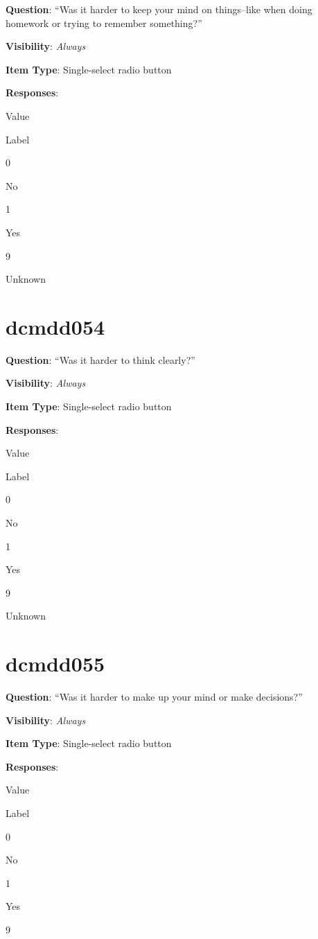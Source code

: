 \documentclass[]{book}
\begin{document}
\textbf{Question}: ``Was it harder to keep your mind on things--like when doing homework or trying to remember something?''

\textbf{Visibility}: \emph{Always}

\textbf{Item Type}: Single-select radio button

\textbf{Responses}:

Value

Label

0

No

1

Yes

9

Unknown

\hypertarget{dcmdd054}{%
\section{dcmdd054}\label{dcmdd054}}

\textbf{Question}: ``Was it harder to think clearly?''

\textbf{Visibility}: \emph{Always}

\textbf{Item Type}: Single-select radio button

\textbf{Responses}:

Value

Label

0

No

1

Yes

9

Unknown

\hypertarget{dcmdd055}{%
\section{dcmdd055}\label{dcmdd055}}

\textbf{Question}: ``Was it harder to make up your mind or make decisions?''

\textbf{Visibility}: \emph{Always}

\textbf{Item Type}: Single-select radio button

\textbf{Responses}:

Value

Label

0

No

1

Yes

9
\end{document}
